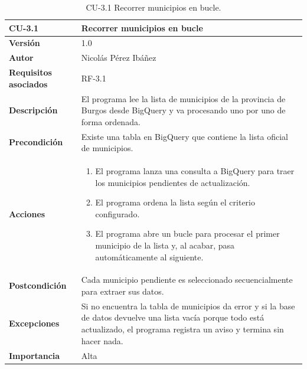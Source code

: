 \begin{table}[p]
	\centering
	\begin{tabularx}{\linewidth}{ p{} p{} }
		\toprule
		\textbf{CU-3.1}  & \textbf{Recorrer municipios en bucle}\\
		\toprule
		\textbf{Versión}              & 1.0    \\
		\textbf{Autor}                & Nicolás Pérez Ibáñez \\
		\textbf{Requisitos asociados} & RF-3.1 \\
		\textbf{Descripción}          & El programa lee la lista de municipios de la provincia de Burgos desde BigQuery y va procesando uno por uno de forma ordenada. \\
		\textbf{Precondición}         & Existe una tabla en BigQuery que contiene la lista oficial de municipios. \\
		\textbf{Acciones}             &
		\begin{enumerate}
			\def\labelenumi{\arabic{enumi}.}
			\tightlist
			\item El programa lanza una consulta a BigQuery para traer los municipios pendientes de actualización.
			\item El programa ordena la lista según el criterio configurado.
			\item El programa abre un bucle para procesar el primer municipio de la lista y, al acabar, pasa automáticamente al siguiente.
		\end{enumerate}\\
		\textbf{Postcondición}        & Cada municipio pendiente es seleccionado secuencialmente para extraer sus datos. \\
		\textbf{Excepciones}          & Si no encuentra la tabla de municipios da error y si la base de datos devuelve una lista vacía porque todo está actualizado, el programa registra un aviso y termina sin hacer nada. \\
		\textbf{Importancia}          & Alta \\
		\bottomrule
	\end{tabularx}
	\caption{CU-3.1 Recorrer municipios en bucle.}
\end{table}

